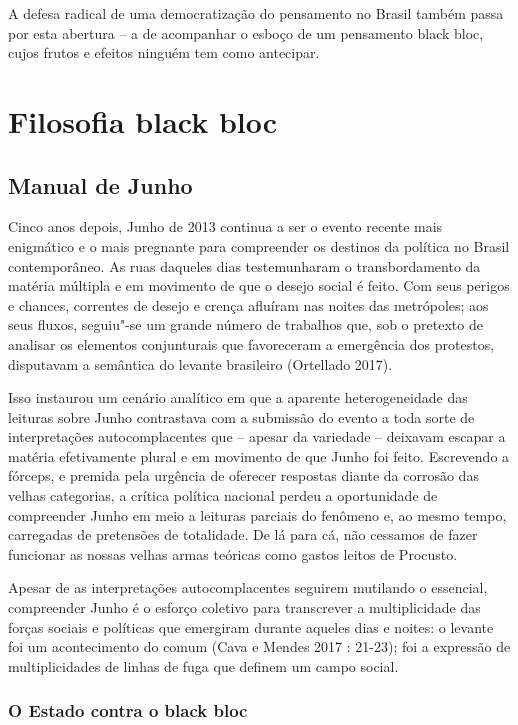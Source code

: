 A defesa radical de uma democratização do pensamento no Brasil também
passa por esta abertura -- a de acompanhar o esboço de um pensamento
black bloc, cujos frutos e efeitos ninguém tem como antecipar.

\part{Filosofia black bloc}

\chapter{Manual de Junho}

Cinco anos depois, Junho de 2013 continua a ser o evento recente mais
enigmático e o mais pregnante para compreender os destinos da política
no Brasil contemporâneo. As ruas daqueles dias testemunharam o
transbordamento da matéria múltipla e em movimento de que o desejo
social é feito. Com seus perigos e chances, correntes de desejo e crença
afluíram nas noites das metrópoles; aos seus fluxos, seguiu"-se um grande
número de trabalhos que, sob o pretexto de analisar os elementos
conjunturais que favoreceram a emergência dos protestos, disputavam a
semântica do levante brasileiro (Ortellado 2017).

Isso instaurou um cenário analítico em que a aparente heterogeneidade
das leituras sobre Junho contrastava com a submissão do evento a toda
sorte de interpretações autocomplacentes que -- apesar da variedade --
deixavam escapar a matéria efetivamente plural e em movimento de que
Junho foi feito. Escrevendo a fórceps, e premida pela urgência de
oferecer respostas diante da corrosão das velhas categorias, a crítica
política nacional perdeu a oportunidade de compreender Junho em meio a
leituras parciais do fenômeno e, ao mesmo tempo, carregadas de
pretensões de totalidade. De lá para cá, não cessamos de fazer funcionar
as nossas velhas armas teóricas como gastos leitos de Procusto.

Apesar de as interpretações autocomplacentes seguirem mutilando o
essencial, compreender Junho é o esforço coletivo para transcrever a
multiplicidade das forças sociais e políticas que emergiram durante
aqueles dias e noites: o levante foi um acontecimento do comum (Cava e
Mendes 2017 : 21-23); foi a expressão de multiplicidades de linhas de
fuga que definem um campo social.

\section{O Estado contra o black bloc}

